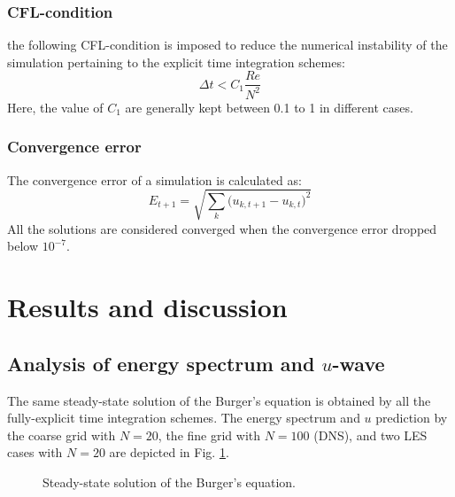 \documentclass[a4paper]{article}
\begin{document}
\subsubsection{CFL-condition}
the following CFL-condition is imposed to reduce the numerical instability of the simulation pertaining to the explicit time integration schemes:
\begin{equation}
	\Delta t < C_1 \frac{Re}{N^2}
	\label{Eq:CFL}
\end{equation}
Here, the value of $ C_1 $ are generally kept between 0.1 to 1 in different cases.

\subsubsection{Convergence error}
The convergence error of a simulation is calculated as:
\begin{equation}
	E_{t+1} = \sqrt{\sum_{k} \big(u_{k,t+1} - u_{k,t}\big)^2}
	\label{Eq:Error}
\end{equation}
All the solutions are considered converged when the convergence error dropped below $ 10^{-7} $.
\section{Results and discussion}
\subsection{Analysis of energy spectrum and $ u $-wave}
\label{sec:gen-results}
The same steady-state solution of the Burger's equation is obtained by all the fully-explicit time integration schemes. The energy spectrum and $ u $ prediction by the coarse grid with $ N=20 $, the fine grid with $ N=100 $ (DNS), and two LES cases with $ N=20 $ are depicted in Fig. \ref{fig:Ek}.

\begin{figure}[H]
	\centering
	\begin{minipage}[b]{0.52\textwidth}
	\end{minipage}%
	\begin{minipage}[b]{0.52\textwidth}
	\end{minipage}
	\caption{Steady-state solution of the Burger's equation.}
	\label{fig:Ek}
\end{figure}
\end{document}

